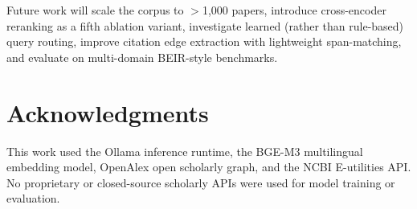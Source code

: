 \documentclass[journal]{IEEEtran}
\begin{document}
Future work will scale the corpus to $>$1,000 papers, introduce
cross-encoder reranking as a fifth ablation variant, investigate
learned (rather than rule-based) query routing, improve citation
edge extraction with lightweight span-matching, and evaluate on
multi-domain BEIR-style benchmarks.

\section*{Acknowledgments}
This work used the Ollama inference runtime, the BGE-M3 multilingual
embedding model, OpenAlex open scholarly graph, and the NCBI
E-utilities API. No proprietary or closed-source scholarly APIs
were used for model training or evaluation.

\balance


\end{document}
